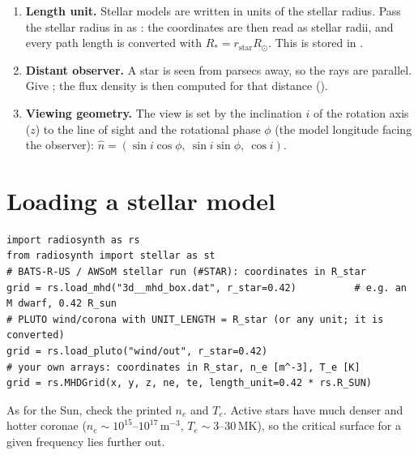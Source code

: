 \begin{enumerate}[itemsep=2pt]
\item \textbf{Length unit.} Stellar models are written in units of the stellar radius.
      Pass the stellar radius in \rsun{} as : the coordinates are then read
      as stellar radii, and every path length is converted with
      $R_\ast=r_\text{star}R_\odot$. This is stored in .
\item \textbf{Distant observer.} A star is seen from parsecs away, so the rays are
      parallel. Give ; the flux density is then computed for that
      distance ().
\item \textbf{Viewing geometry.} The view is set by the inclination $i$ of the rotation
      axis ($z$) to the line of sight and the rotational phase $\phi$ (the model longitude
      facing the observer): $\hat n=(\sin i\cos\phi,\ \sin i\sin\phi,\ \cos i)$.
\end{enumerate}

\section{Loading a stellar model}
\begin{lstlisting}[style=pyex]
import radiosynth as rs
from radiosynth import stellar as st
# BATS-R-US / AWSoM stellar run (#STAR): coordinates in R_star
grid = rs.load_mhd("3d__mhd_box.dat", r_star=0.42)          # e.g. an M dwarf, 0.42 R_sun
# PLUTO wind/corona with UNIT_LENGTH = R_star (or any unit; it is converted)
grid = rs.load_pluto("wind/out", r_star=0.42)
# your own arrays: coordinates in R_star, n_e [m^-3], T_e [K]
grid = rs.MHDGrid(x, y, z, ne, te, length_unit=0.42 * rs.R_SUN)
\end{lstlisting}
As for the Sun, check the printed $n_e$ and $T_e$. Active stars have much denser and hotter
coronae ($n_e\sim10^{15}$--$10^{17}$\,m$^{-3}$, $T_e\sim3$--30\,MK), so the critical
surface for a given frequency lies further out.

